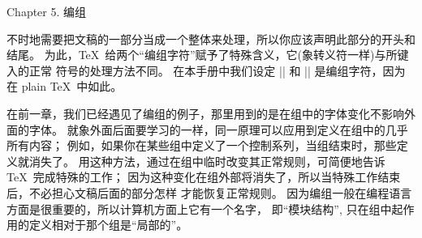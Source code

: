 


\beginchapter Chapter 5. 编组


\1不时地需要把文稿的一部分当成一个整体来处理，所以你应该声明此部分的开头和结尾。%
为此，\TeX\ 给两个``编组字符''赋予了特殊含义，它(象转义符一样)与所键入的正常%
符号的处理方法不同。%
在本手册中我们设定 |{| 和 |}| 是编组字符，因为在 plain \TeX\ 中如此。

在前一章，我们已经遇见了编组的例子，那里用到的是在组中的字体变化不影响外面的字\hbox{体。}%
就象外面后面要学习的一样，同一原理可以应用到定义在组中的几乎所有内容；
例如，如果你在某些组中定义了一个控制系列，当组结束时，那些定义就消失了。%
用这种方法，通过在组中临时改变其正常规则，可简便地告诉 \TeX\ 完成特殊的工作；
因为这种变化在组外部将消失了，所以当特殊工作结束后，不必担心文稿后面的部分怎样%
才能恢复正常规则。%
因为编组一般在编程语言方面是很重要的，所以计算机方面上它有一个名字，
即``模块结构'', 只在组中起作用的定义相对于那个组是``局部的''。

